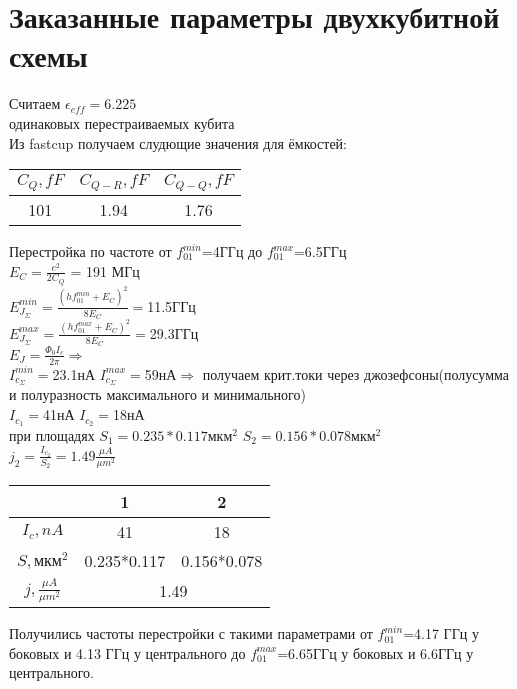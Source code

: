 \documentclass[12pt, twoside]{report}
\begin{document}
	\section{Заказанные параметры двухкубитной схемы}
\noindent Считаем $\epsilon_{eff}=6.225$\\
 одинаковых перестраиваемых кубита\\
\noindent Из fastcup получаем слудющие значения для ёмкостей:
	\begin{center}
		\begin{tabular}{ | c | c | c | }
   		 	\hline
   			$C_Q,fF$ & $ C_{Q-R},fF$ &$ C_{Q-Q},fF$ \\ \hline
   		 	101 & 1.94 & 1.76 \\ \hline
		\end{tabular}
	\end{center}
\noindent Перестройка по частоте от $f_{01}^{min}$=4ГГц до $f_{01}^{max}$=6.5ГГц\\
$E_{C}=\frac{e^2}{2C_Q}$ = 191 МГц\\
$E_{J_{\Sigma}}^{min} = \frac{(hf_{01}^{min}+E_{C})^2}{8E_{C}}=$11.5ГГц \\
$E_{J_{\Sigma}}^{max} = \frac{(hf_{01}^{max}+E_{C})^2}{8E_{C}}=$29.3ГГц \\
$E_{J}=\frac{\Phi_0 I_c}{2\pi}\Rightarrow$ \\
$I_{c_{\Sigma}}^{min}=$23.1нА $I_{c_{\Sigma}}^{max}=$59нА$\Rightarrow$
получаем крит.токи через джозефсоны(полусумма и полуразность максимального и минимального)\\
$I_{c_{1}}=$41нА $I_{c_{2}}=$18нА\\
при площадях $S_1 = 0.235*0.117 \text{мкм}^2$  $S_2 = 0.156*0.078\text{мкм}^2$  \\
$j_2=\frac{I_{c_{2}}}{S_2}=1.49\frac{\mu A}{{\mu m}^2}$
	\begin{center}
		\begin{tabular}{ | c | c | c |}
   		 	\hline
   			  &1 &2 \\ \hline
    			 $I_c,nA$ & 41 & 18 \\ \hline
    	 		$S,{\text{мкм}}^2$ & 0.235*0.117 & 0.156*0.078  \\ \hline
    	 		 $j,\frac{\mu A}{{\mu m}^2}$  &\multicolumn{2}{|c|}{1.49}\\ \hline
		\end{tabular}
	\end{center}
	
Получились частоты перестройки с такими параметрами 
от $f_{01}^{min}$=4.17 ГГц у боковых и 4.13 ГГц у центрального до $f_{01}^{max}$=6.65ГГц у боковых и 6.6ГГц у центрального.
\end{document}
